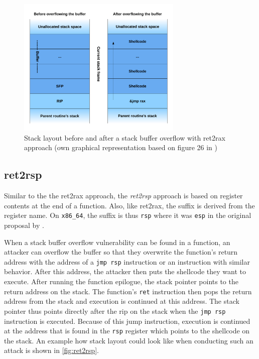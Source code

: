 \begin{figure}[htb]
	\centering
	\includegraphics[width=0.7\textwidth]{figures/ret2rax}
	\caption{Stack layout before and after a stack buffer overflow with ret2rax approach (own graphical representation based on figure 26 in \cite[14]{Mueller2008})}
	\label{fig:ret2rax}
\end{figure}

\subsection{ret2rsp}
\label{subsec:aici-ret2rsp}

Similar to the the ret2rax approach, the \emph{ret2rsp} approach is based on register contents at the end of a function.
Also, like ret2rax, the suffix is derived from the register name.
On \texttt{x86\_64}, the suffix is thus \texttt{rsp} where it was \texttt{esp} in the original proposal by \citeauthor{Kotler2005} \cite{Kotler2005}.

When a stack buffer overflow vulnerability can be found in a function, an attacker can overflow the buffer so that they overwrite the function's return address with the address of a \texttt{jmp rsp} instruction or an instruction with similar behavior.
After this address, the attacker then puts the shellcode they want to execute.
After running the function epilogue, the stack pointer points to the return address on the stack.
The function's \texttt{ret} instruction then pops the return address from the stack and execution is continued at this address.
The stack pointer thus points directly after the \gls{rip} on the stack when the \texttt{jmp rsp} instruction is executed.
Because of this jump instruction, execution is continued at the address that is found in the \texttt{rsp} register which points to the shellcode on the stack.
An example how stack layout could look like when conducting such an attack is shown in \cref{fig:ret2rsp}.

